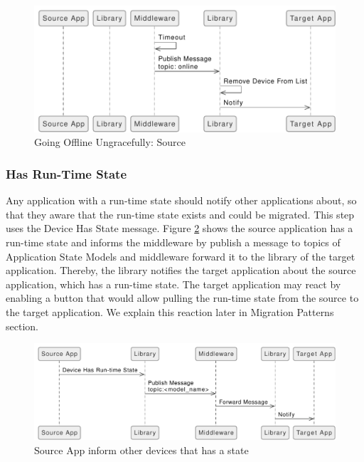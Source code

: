 \FloatBarrier \begin{figure}[H]
    \includegraphics[width=\linewidth]{../figures/Going-Offline-Ungraceful-Source.pdf}
    \centering
    \caption{Going Offline Ungracefully: Source}
    \label{fig:Going-Offline-Ungraceful-Source}
\end{figure} \FloatBarrier

\subsubsection{Has Run-Time State}
Any application with a run-time state should notify other applications about, so that they aware that the run-time state exists and could be migrated. This step uses the Device Has State message. Figure \ref{fig:Inform-Devices-Has-State-Source} shows the source application has a run-time state and informs the middleware by publish a message to topics of Application State Models and middleware forward it to the library of the target application. Thereby, the library notifies the target application about the source application, which has a run-time state. The target application may react by enabling a button that would allow pulling the run-time state from the source to the target application. We explain this reaction later in Migration Patterns section.

\FloatBarrier \begin{figure}[H]
    \includegraphics[width=\linewidth]{../figures/Inform-Devices-Has-State-Source.pdf}
    \centering
    \caption{Source App inform other devices that has a state}
    \label{fig:Inform-Devices-Has-State-Source}
\end{figure} \FloatBarrier

